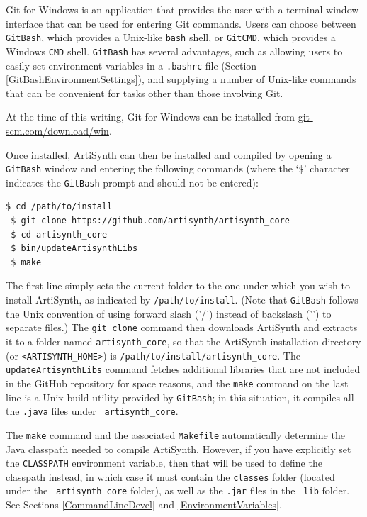 Git for Windows is an application that provides the user with a
terminal window interface that can be used for entering Git commands.
Users can choose between {\tt GitBash}, which provides a Unix-like
{\tt bash} shell, or {\tt GitCMD}, which provides a Windows {\tt CMD}
shell. {\tt GitBash} has several advantages, such as allowing users
to easily set environment variables in a {\tt .bashrc} file
(Section \ref{GitBashEnvironmentSettings}), and supplying a number of
Unix-like commands that can be convenient for tasks other than those
involving Git.

At the time of this writing, Git for Windows can be installed from
\href{https://git-scm.com/download/win}{git-scm.com/download/win}.

Once installed, ArtiSynth can then be installed and compiled by
opening a {\tt GitBash} window and entering the following commands
(where the `{\tt \$}' character indicates the {\tt GitBash} prompt
and should not be entered):
%
\begin{lstlisting}[]
 $ cd /path/to/install
 $ git clone https://github.com/artisynth/artisynth_core
 $ cd artisynth_core
 $ bin/updateArtisynthLibs
 $ make
\end{lstlisting}
%
The first line simply sets the current folder to the one under which
you wish to install ArtiSynth, as indicated by {\tt /path/to/install}.
(Note that {\tt GitBash} follows the Unix convention of using forward
slash ('/') instead of backslash ('\BKS ') to separate files.)  The
{\tt git clone} command then downloads ArtiSynth and extracts it to a
folder named {\tt artisynth\_core}, so that the ArtiSynth installation
directory (or {\tt <ARTISYNTH\_HOME>}) is\pdfbreak 
{\tt /path/to/install/artisynth\_core}. The {\tt updateArtisynthLibs}
command fetches additional libraries that are not included in the
GitHub repository for space reasons, and the {\tt make} command on the
last line is a Unix build utility provided by {\tt GitBash}; in this
situation, it compiles all the {\tt .java} files under {\tt
artisynth\_core}.

\begin{sideblock}
The {\tt make} command and the associated {\tt Makefile} automatically
determine the Java classpath needed to compile ArtiSynth.  However, if
you have explicitly set the {\tt CLASSPATH} environment variable, then
that will be used to define the classpath instead, in which case it
must contain the {\tt classes} folder (located under the {\tt
artisynth\_core} folder), as well as the {\tt .jar} files in the {\tt
lib} folder. See Sections \ref{CommandLineDevel}
and \ref{EnvironmentVariables}.
\end{sideblock}


